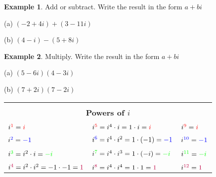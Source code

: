 \documentclass{report}
\theoremstyle{definition}
\newtheorem{example}{\bf Example}
\begin{document}
 \newpage

\begin{example}
Add or subtract. Write the result in the form $a+bi$
\end{example}


 \begin{minipage}[t]{0.45\linewidth}
 (a)  $(-2+4i)+(3-11i)$ 
 \end{minipage}
 \hfill
 \begin{minipage}[t]{0.45\linewidth}
 (b)  $(4-i)-(5+8i)$
 \end{minipage}
 
 \vspace{2cm}
 
 
 \begin{example}
 Multiply. Write the result in the form $a+bi$
 \end{example}
 
  \begin{minipage}[t]{0.45\linewidth}
 (a)  $(5-6i)(4-3i)$
 \end{minipage}
 \hfill
 \begin{minipage}[t]{0.45\linewidth}
 (b) $(7+2i)(7-2i)$
 \end{minipage}
 
  \vspace{2cm}
 
 
 \begin{center}
	 \begin{tabular}[t]{|l|l|l|}
	 \hline
	 \multicolumn{3}{|c|}{}\\
	 \multicolumn{3}{|c|}{\textbf{Powers of $i$}}\\
	 \hline
	 &&\\
	 $i^{\color{red}1\color{black}}=\color{red}i\color{black}$ & $i^{\color{red}5\color{black}}=i^4\cdot i=1\cdot i =\color{red} i\color{black}$ & $i^{\color{red}9\color{black}}=\color{red} i\color{black}$\\
	 \hline
	 &&\\
	  $i^{\color{blue}2\color{black}}=\color{blue}-1\color{black}$ & $i^{\color{blue}6\color{black}}=i^4\cdot i^2=1\cdot (-1) =\color{blue} -1\color{black}$ & $i^{\color{blue}10\color{black}}=\color{blue} -1\color{black}$\\
	  \hline
	   &&\\
	  $i^{\color{green}3\color{black}}=i^2\cdot i = \color{green}-i\color{black}$ & $i^{\color{green}7\color{black}}=i^4\cdot i^3=1\cdot (-i) =\color{green} -i\color{black}$ & $i^{\color{green}11\color{black}}=\color{green} -i\color{black}$\\
	  \hline
	   &&\\
	  $i^{\color{purple}4\color{black}}=i^2\cdot i^2 = -1 \cdot -1 =  \color{purple} 1\color{black}$ & $i^{\color{purple}8\color{black}}=i^4\cdot i^4=1\cdot 1 =\color{purple} 1\color{black}$ & $i^{\color{purple}12\color{black}}=\color{purple} 1\color{black}$\\
	  \hline
	\end{tabular}
 \end{center}
 
\end{document}
